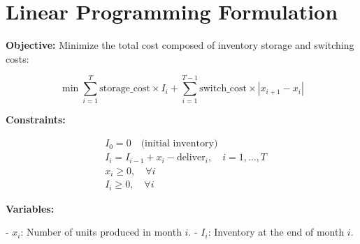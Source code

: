 \documentclass{article}
\begin{document}
\section*{Linear Programming Formulation}

\textbf{Objective:}
Minimize the total cost composed of inventory storage and switching costs:

\[
\min \sum_{i=1}^{T} \text{storage\_cost} \times I_i + \sum_{i=1}^{T-1} \text{switch\_cost} \times |x_{i+1} - x_i|
\]

\textbf{Constraints:}

\begin{align*}
& I_0 = 0 \quad \text{(initial inventory)} \\
& I_i = I_{i-1} + x_i - \text{deliver}_i, \quad i = 1, \ldots, T \\
& x_i \geq 0, \quad \forall i \\
& I_i \geq 0, \quad \forall i
\end{align*}

\textbf{Variables:}

- \( x_i \): Number of units produced in month \( i \).
- \( I_i \): Inventory at the end of month \( i \).
\end{document}

